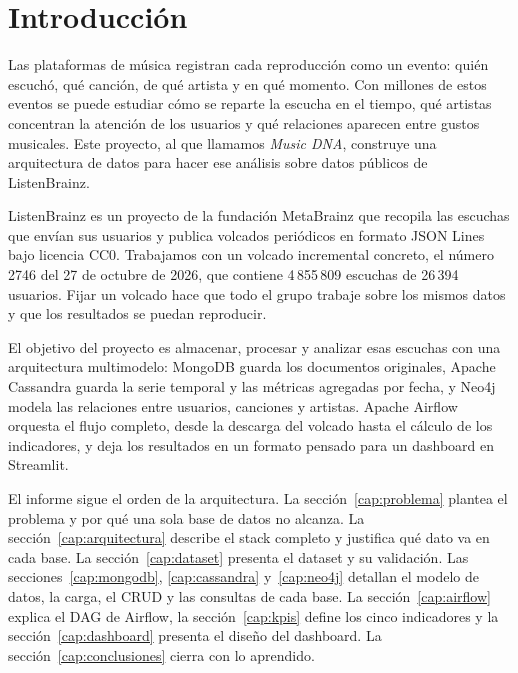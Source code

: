 \section{Introducción}

Las plataformas de música registran cada reproducción como un evento: quién escuchó, qué canción, de qué artista y en qué momento. Con millones de estos eventos se puede estudiar cómo se reparte la escucha en el tiempo, qué artistas concentran la atención de los usuarios y qué relaciones aparecen entre gustos musicales. Este proyecto, al que llamamos \emph{Music DNA}, construye una arquitectura de datos para hacer ese análisis sobre datos públicos de ListenBrainz.

ListenBrainz es un proyecto de la fundación MetaBrainz que recopila las escuchas que envían sus usuarios y publica volcados periódicos en formato JSON Lines bajo licencia CC0. Trabajamos con un volcado incremental concreto, el número 2746 del 27 de octubre de 2026, que contiene 4\,855\,809 escuchas de 26\,394 usuarios. Fijar un volcado hace que todo el grupo trabaje sobre los mismos datos y que los resultados se puedan reproducir.

El objetivo del proyecto es almacenar, procesar y analizar esas escuchas con una arquitectura multimodelo: MongoDB guarda los documentos originales, Apache Cassandra guarda la serie temporal y las métricas agregadas por fecha, y Neo4j modela las relaciones entre usuarios, canciones y artistas. Apache Airflow orquesta el flujo completo, desde la descarga del volcado hasta el cálculo de los indicadores, y deja los resultados en un formato pensado para un dashboard en Streamlit.

El informe sigue el orden de la arquitectura. La sección~\ref{cap:problema} plantea el problema y por qué una sola base de datos no alcanza. La sección~\ref{cap:arquitectura} describe el stack completo y justifica qué dato va en cada base. La sección~\ref{cap:dataset} presenta el dataset y su validación. Las secciones~\ref{cap:mongodb}, \ref{cap:cassandra} y~\ref{cap:neo4j} detallan el modelo de datos, la carga, el CRUD y las consultas de cada base. La sección~\ref{cap:airflow} explica el DAG de Airflow, la sección~\ref{cap:kpis} define los cinco indicadores y la sección~\ref{cap:dashboard} presenta el diseño del dashboard. La sección~\ref{cap:conclusiones} cierra con lo aprendido.
